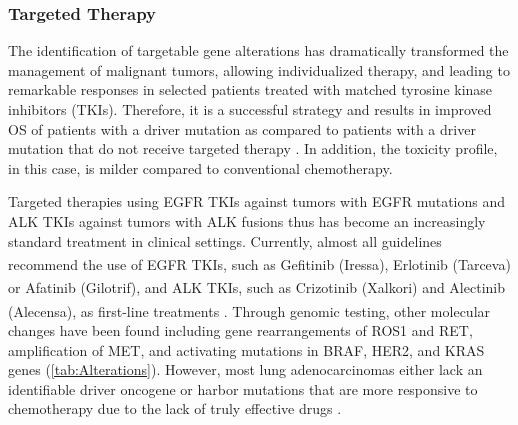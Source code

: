 \subsubsection{Targeted Therapy} \label{sec:Targeted}

The identification of targetable gene alterations has dramatically transformed the management of malignant tumors, allowing individualized therapy, and leading to remarkable responses in selected patients treated with matched tyrosine kinase inhibitors (TKIs). Therefore, it is a successful strategy and results in improved OS of patients with a driver mutation as compared to patients with a driver mutation that do not receive targeted therapy \cite{Targeted_drugs}. In addition, the toxicity profile, in this case, is milder compared to conventional chemotherapy.

Targeted therapies using EGFR TKIs against tumors with EGFR mutations and ALK TKIs against tumors with ALK fusions thus has become an increasingly standard treatment in clinical settings. Currently, almost all guidelines recommend the use of EGFR TKIs, such as Gefitinib (Iressa\textsuperscript\textregistered), Erlotinib (Tarceva\textsuperscript\textregistered) or Afatinib (Gilotrif\textsuperscript\textregistered), and ALK TKIs, such as Crizotinib (Xalkori\textsuperscript\textregistered) and Alectinib (Alecensa\textsuperscript\textregistered), as first-line treatments \cite{Mol_bio, ALK_fusions, NSCLC_therapies}. Through genomic testing, other molecular changes have been found including gene rearrangements of ROS1 and RET, amplification of MET, and activating mutations in BRAF, HER2, and KRAS genes (\autoref{tab:Alterations}). However, most lung adenocarcinomas either lack an identifiable driver oncogene or harbor mutations that are more responsive to chemotherapy due to the lack of truly effective drugs \cite{Mol_profiling}.

